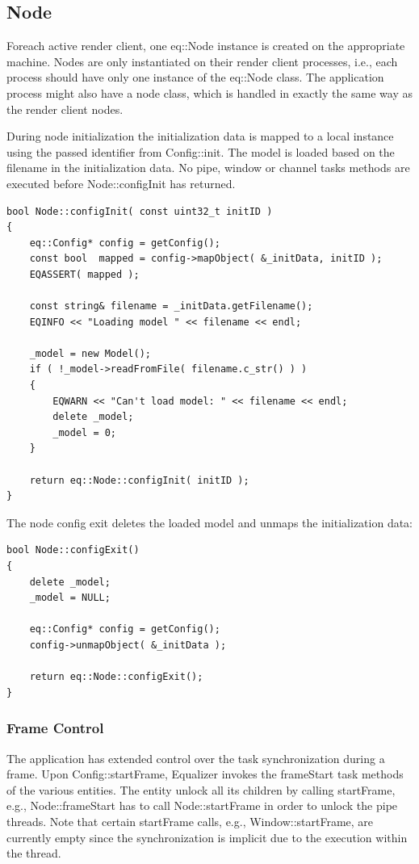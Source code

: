 \documentclass[10pt,a4]{scrartcl}
\begin{document}
\subsection{Node}

Foreach active render client, one \textsf{eq::Node} instance is
created on the appropriate machine. Nodes are only instantiated on their
render client processes, i.e., each process should have only one
instance of the \textsf{eq::Node} class. The application process might
also have a node class, which is handled in exactly the same way as the
render client nodes.

During node initialization the initialization data is mapped to
a local instance using the passed identifier from
\textsf{Config::init}. The model is loaded based on the filename in the
initialization data. No pipe, window or channel tasks methods are
executed before \textsf{Node::configInit} has returned.

{\footnotesize\begin{lstlisting}
bool Node::configInit( const uint32_t initID )
{
    eq::Config* config = getConfig();
    const bool  mapped = config->mapObject( &_initData, initID );
    EQASSERT( mapped );

    const string& filename = _initData.getFilename();
    EQINFO << "Loading model " << filename << endl;

    _model = new Model();
    if ( !_model->readFromFile( filename.c_str() ) )
    {
        EQWARN << "Can't load model: " << filename << endl;
        delete _model;
        _model = 0;
    }
    
    return eq::Node::configInit( initID );
}
\end{lstlisting}}%

The node config exit deletes the loaded model and unmaps the
initialization data: 

{\footnotesize\begin{lstlisting}
bool Node::configExit()
{
    delete _model;
    _model = NULL;

    eq::Config* config = getConfig();
    config->unmapObject( &_initData );

    return eq::Node::configExit();
}
\end{lstlisting}}

\subsubsection{Frame Control}

The application has extended control over the task synchronization
during a frame. Upon \textsf{Config::startFrame}, Equalizer invokes the
\textsf{frameStart} task methods of the various entities. The entity
unlock all its children by calling \textsf{startFrame}, e.g.,
\textsf{Node::frameStart} has to call \textsf{Node::startFrame} in order
to unlock the pipe threads. Note that certain \textsf{startFrame} calls,
e.g., \textsf{Window::startFrame}, are currently empty since the
synchronization is implicit due to the execution within the thread.
\end{document}
